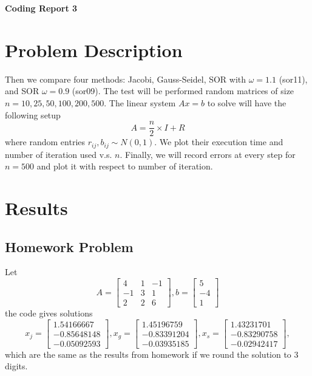\documentclass[a4paper,12pt]{article}
\begin{document}
\begin{center} %
	{\Large \bf Coding Report 3} %
	\vspace{2mm}
\end{center}  


\section{Problem Description}

Then we compare four methods: Jacobi, Gauss-Seidel, SOR with $\omega = 1.1$ (sor11), and SOR $\omega = 0.9$ (sor09).
The test will be performed random matrices of size $n = 10, 25, 50, 100, 200, 500$.
The linear system $Ax = b$ to solve will have the following setup
$$
A = \frac{n}{2} \times I + R
$$
where random entries $r_{ij}, b_{ij} \sim N(0, 1)$.
We plot their execution time and number of iteration used v.s. $n$.
Finally, we will record errors at every step for $n = 500$ 
and plot it with respect to number of iteration.

\section{Results}

\subsection{Homework Problem}
Let 
$$
A = \begin{bmatrix}
	4 & 1 & -1 \\
	-1 & 3 & 1 \\
	2 & 2 & 6
\end{bmatrix},
b = \begin{bmatrix}
	5 \\ -4 \\ 1
\end{bmatrix}
$$
the code gives solutions
$$
x_j = \begin{bmatrix}
	 1.54166667 \\
	-0.85648148 \\
	-0.05092593 
\end{bmatrix},
x_g = \begin{bmatrix}
	 1.45196759 \\
	-0.83391204 \\
	-0.03935185 
\end{bmatrix},
x_s = \begin{bmatrix}
	 1.43231701 \\
	-0.83290758 \\
	-0.02942417 
\end{bmatrix},
$$
which are the same as the results from homework if we round the solution to 3 digits.
\end{document}
